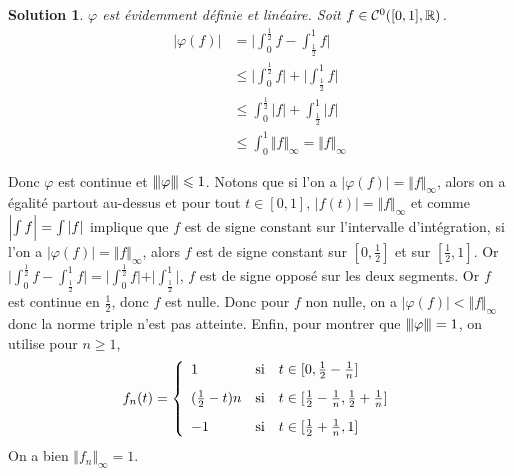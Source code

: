 \documentclass[12pt]{article}
\newtheorem{solution}{Solution}[section]
\theoremstyle{remark}
\newcommand{\vertiii}[1]{{\left\vert\kern-0.25ex\left\vert\kern-0.25ex\left\vert{}#1
\right\vert\kern-0.25ex\right\vert\kern-0.25ex\right\vert}}
\numberwithin{equation}{section}
\begin{document}
\begin{solution}
	$\varphi$ est évidemment définie et linéaire. Soit $f\in\mathcal{C}^{0}([0,1],\mathbb{R})$.
	\begin{align*}
		\vert\varphi(f)\vert
		&=\Biggl\vert\int_{0}^{\frac{1}{2}}f-\int_{\frac{1}{2}}^{1}f\Biggr\vert\\
		&\leqslant\Biggl\vert\int_{0}^{\frac{1}{2}}f\Biggr\vert+\Biggl\vert\int_{\frac{1}{2}}^{1}f\Biggr\vert\\
		&\leqslant\int_{0}^{\frac{1}{2}}\vert f\vert+\int_{\frac{1}{2}}^{1}\vert f\vert\\
		&\leqslant\int_{0}^{1}\Vert f\Vert_{\infty}=\Vert f\Vert_{\infty}
	\end{align*}
\end{solution}

Donc $\varphi$ est continue et $\vertiii{\varphi}\leqslant1$. Notons que si l'on a $\vert\varphi(f)\vert=\Vert f\Vert_{\infty}$, alors on a égalité partout au-dessus et pour tout $t\in[0,1]$, $\vert f(t)\vert=\Vert f\Vert_{\infty}$ et comme $\Bigl\vert\int f\Bigr\vert=\int\vert f\vert$ implique que $f$ est de signe constant sur l'intervalle d'intégration, si l'on a $\vert\varphi(f)\vert=\Vert f\Vert_{\infty}$, alors $f$ est de signe constant sur $[0,\frac{1}{2}]$ et sur $[\frac{1}{2},1]$.  Or $\vert\int_{0}^{\frac{1}{2}}f-\int_{\frac{1}{2}}^{1}f\vert=\vert\int_{0}^{\frac{1}{2}}f\vert+\vert\int_{\frac{1}{2}}^{1}\vert$, $f$ est de signe opposé sur les deux segments. Or $f$ est continue en $\frac{1}{2}$, donc $f$ est nulle. Donc pour $f$ non nulle, on a $\vert\varphi(f)\vert<\Vert f\Vert_{\infty}$ donc la norme triple n'est pas atteinte. Enfin, pour montrer que $\vertiii{\varphi}=1$, on utilise pour $n\geqslant1$,
$$
f_{n}(t)=
\left\{
	\begin{array}[]{lll}
		1 & \text{si} & t\in[0,\frac{1}{2}-\frac{1}{n}]\\[0.3cm]
		(\frac{1}{2}-t)n & \text{si} & t\in[\frac{1}{2}-\frac{1}{n},\frac{1}{2}+\frac{1}{n}]\\[0.3cm]
		-1 & \text{si} & t\in[\frac{1}{2}+\frac{1}{n},1]
	\end{array}
\right.
$$
On a bien $\Vert f_{n}\Vert_{\infty}=1$.
\end{document}
